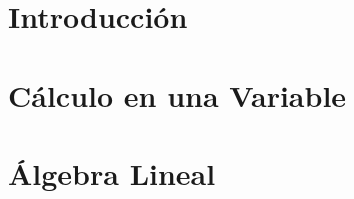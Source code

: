 \documentclass{book}
\begin{document}

\tableofcontents

\chapter{Introducción}


\chapter{Cálculo en una Variable}


\chapter{Álgebra Lineal}


\printbibliography
\end{document}
